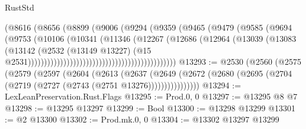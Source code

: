 \begin{lexlean}{RustStd}
\begin{coremodule}
                                                    (@8616
                                                      (@8656
                                                        (@8899
                                                          (@9006
                                                            (@9294
                                                              (@9359
                                                                (@9465
                                                                  (@9479
                                                                    (@9585
                                                                      (@9694
                                                                        (@9753
                                                                          (@10106
                                                                            (@10341
                                                                              (@11346
                                                                                (@12267
                                                                                  (@12686
                                                                                    (@12964
                                                                                      (@13039
                                                                                        (@13083
                                                                                          (@13142
                                                                                            (@2532
                                                                                              (@13149
                                                                                                @13227)
                                                                                              (@15
                                                                                                @2531))))))))))))))))))))))))))))))))))))))))))))))
@13293 := @2530
    (@2560
      (@2575
        (@2579
          (@2597
            (@2604
              (@2613
                (@2637
                  (@2649
                    (@2672 (@2680 (@2695 (@2704 (@2719 (@2727 (@2743 (@2751 @13276))))))))))))))))
@13294 := LexLeanPreservation.Rust.Flags
@13295 := Prod.{0, 0}
@13297 := @13295 @8 @7
@13298 := @13295 @13297
@13299 := Bool
@13300 := @13298 @13299
@13301 := @2 @13300
@13302 := Prod.mk.{0, 0}
@13304 := @13302 @13297 @13299

\end{coremodule}
\end{lexlean}
